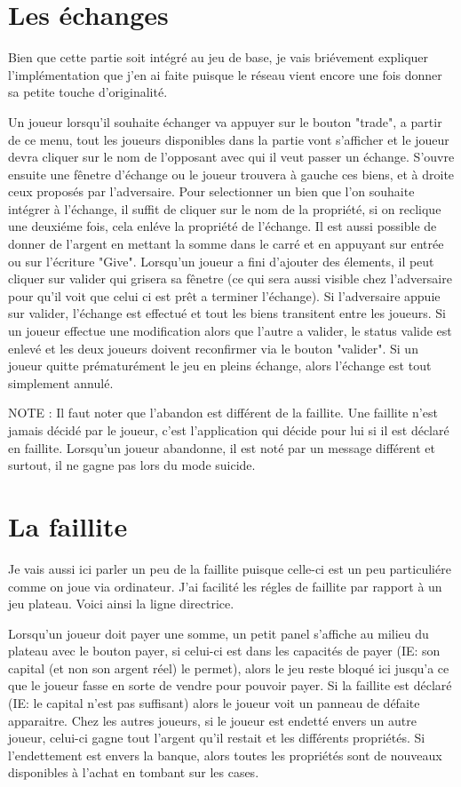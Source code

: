 \documentclass[12pt, openany]{report}
\begin{document}
    \section{Les échanges}
	Bien que cette partie soit intégré au jeu de base, je vais briévement expliquer l'implémentation que j'en ai faite puisque le réseau vient encore une fois donner sa petite touche d'originalité.

Un joueur lorsqu'il souhaite échanger va appuyer sur le bouton "trade", a partir de ce menu, tout les joueurs disponibles dans la partie vont s'afficher et le joueur devra cliquer sur le nom de l'opposant avec qui il veut passer un échange. S'ouvre ensuite une fênetre d'échange ou le joueur trouvera à gauche ces biens, et à droite ceux proposés par l'adversaire. Pour selectionner un bien que l'on souhaite intégrer à l'échange, il suffit de cliquer sur le nom de la propriété, si on reclique une deuxiéme fois, cela enléve la propriété de l'échange. Il est aussi possible de donner de l'argent en mettant la somme dans le carré et en appuyant sur entrée ou sur l'écriture "Give". Lorsqu'un joueur a fini d'ajouter des élements, il peut cliquer sur valider qui grisera sa fênetre (ce qui sera aussi visible chez l'adversaire pour qu'il voit que celui ci est prêt a terminer l'échange). Si l'adversaire appuie sur valider, l'échange est effectué et tout les biens transitent entre les joueurs. Si un joueur effectue une modification alors que l'autre a valider, le status valide est enlevé et les deux joueurs doivent reconfirmer via le bouton "valider". Si un joueur quitte prématurément le jeu en pleins échange, alors l'échange est tout simplement annulé.

NOTE : Il faut noter que l'abandon est différent de la faillite. Une faillite n'est jamais décidé par le joueur, c'est l'application qui décide pour lui si il est déclaré en faillite. Lorsqu'un joueur abandonne, il est noté par un message différent et surtout, il ne gagne pas lors du mode suicide.

    \section{La faillite}
	Je vais aussi ici parler un peu de la faillite puisque celle-ci est un peu particuliére comme on joue via ordinateur. J'ai facilité les régles de faillite par rapport à un jeu plateau. Voici ainsi la ligne directrice.

Lorsqu'un joueur doit payer une somme, un petit panel s'affiche au milieu du plateau avec le bouton payer, si celui-ci est dans les capacités de payer (IE: son capital (et non son argent réel) le permet), alors le jeu reste bloqué ici jusqu'a ce que le joueur fasse en sorte de vendre pour pouvoir payer. Si la faillite est déclaré (IE: le capital n'est pas suffisant) alors le joueur voit un panneau de défaite apparaitre. Chez les autres joueurs, si le joueur est endetté envers un autre joueur, celui-ci gagne tout l'argent qu'il restait et les différents propriétés. Si l'endettement est envers la banque, alors toutes les propriétés sont de nouveaux disponibles à l'achat en tombant sur les cases.
\end{document}

